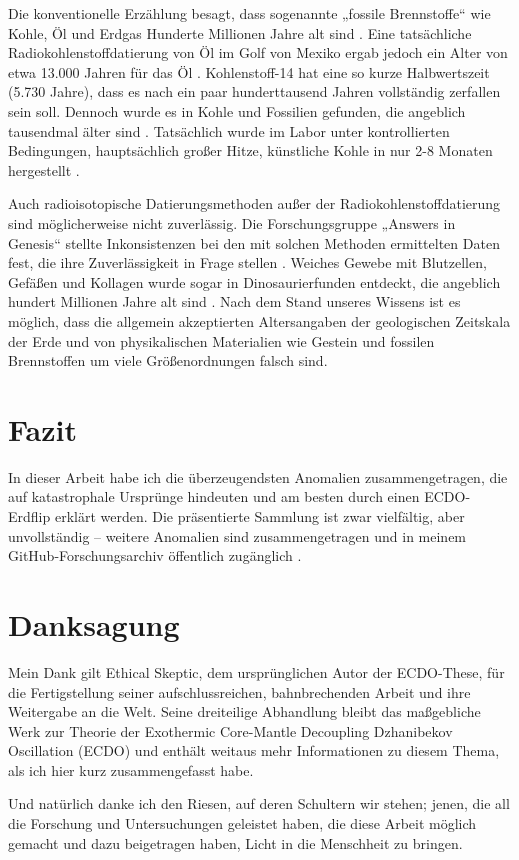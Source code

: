 \documentclass[10pt,twocolumn,letterpaper]{article}
\renewcommand{\refname}{Literaturverzeichnis}
\begin{document}
Die konventionelle Erzählung besagt, dass sogenannte „fossile Brennstoffe“ wie Kohle, Öl und Erdgas Hunderte Millionen Jahre alt sind \cite{104}. Eine tatsächliche Radiokohlenstoffdatierung von Öl im Golf von Mexiko ergab jedoch ein Alter von etwa 13.000 Jahren für das Öl \cite{105}. Kohlenstoff-14 hat eine so kurze Halbwertszeit (5.730 Jahre), dass es nach ein paar hunderttausend Jahren vollständig zerfallen sein soll. Dennoch wurde es in Kohle und Fossilien gefunden, die angeblich tausendmal älter sind \cite{106}. Tatsächlich wurde im Labor unter kontrollierten Bedingungen, hauptsächlich großer Hitze, künstliche Kohle in nur 2-8 Monaten hergestellt \cite{107}.

Auch radioisotopische Datierungsmethoden außer der Radiokohlenstoffdatierung sind möglicherweise nicht zuverlässig. Die Forschungsgruppe „Answers in Genesis“ stellte Inkonsistenzen bei den mit solchen Methoden ermittelten Daten fest, die ihre Zuverlässigkeit in Frage stellen \cite{108}. Weiches Gewebe mit Blutzellen, Gefäßen und Kollagen wurde sogar in Dinosaurierfunden entdeckt, die angeblich hundert Millionen Jahre alt sind \cite{109,110}. Nach dem Stand unseres Wissens ist es möglich, dass die allgemein akzeptierten Altersangaben der geologischen Zeitskala der Erde und von physikalischen Materialien wie Gestein und fossilen Brennstoffen um viele Größenordnungen falsch sind.

\section{Fazit}

In dieser Arbeit habe ich die überzeugendsten Anomalien zusammengetragen, die auf katastrophale Ursprünge hindeuten und am besten durch einen ECDO-Erdflip erklärt werden. Die präsentierte Sammlung ist zwar vielfältig, aber unvollständig – weitere Anomalien sind zusammengetragen und in meinem GitHub-Forschungsarchiv öffentlich zugänglich \cite{2}.

\section{Danksagung}

Mein Dank gilt Ethical Skeptic, dem ursprünglichen Autor der ECDO-These, für die Fertigstellung seiner aufschlussreichen, bahnbrechenden Arbeit und ihre Weitergabe an die Welt. Seine dreiteilige Abhandlung \cite{1} bleibt das maßgebliche Werk zur Theorie der Exothermic Core-Mantle Decoupling Dzhanibekov Oscillation (ECDO) und enthält weitaus mehr Informationen zu diesem Thema, als ich hier kurz zusammengefasst habe.

Und natürlich danke ich den Riesen, auf deren Schultern wir stehen; jenen, die all die Forschung und Untersuchungen geleistet haben, die diese Arbeit möglich gemacht und dazu beigetragen haben, Licht in die Menschheit zu bringen.

\clearpage
\twocolumn

{\small


}
\end{document}
